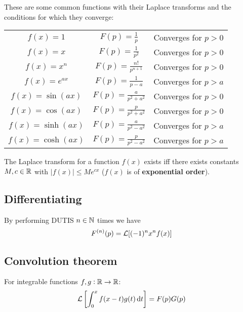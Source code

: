 \documentclass[../Year1.tex]{subfiles}
\begin{document}
\begin{theorem}
    These are some common functions with their Laplace transforms and the conditions for which they converge:
    \renewcommand{\arraystretch}{2}
    \begin{center}
        
        \begin{tabular}{|c|c|c|}
            \hline
            $f(x) = 1$ & $\displaystyle F(p) = \frac{1}{p}$ & Converges for $p>0$ \\
            $f(x) = x$ & $\displaystyle F(p) = \frac{1}{p^2}$ & Converges for $p>0$ \\
            $f(x) = x^n$ & $\displaystyle F(p) = \frac{n!}{p^{n+1}}$ & Converges for $p>0$ \\
            $f(x) = e^{ax}$ & $\displaystyle F(p) = \frac{1}{p-a}$ & Converges for $p>a$ \\
            $f(x) = \sin(ax)$ & $\displaystyle F(p) = \frac{a}{p^2+a^2}$ & Converges for $p>0$ \\
            $f(x) = \cos(ax)$ & $\displaystyle F(p) = \frac{p}{p^2+a^2}$ & Converges for $p>0$ \\
            $f(x) = \sinh(ax)$ & $\displaystyle F(p) = \frac{a}{p^2-a^2}$ & Converges for $p>a$ \\
            \rule[-12pt]{0pt}{0pt} $f(x) = \cosh(ax)$ & $\displaystyle F(p) = \frac{p}{p^2-a^2}$ & Converges for $p>a$ \\ \hline
        \end{tabular}
    \end{center}
    
\end{theorem}

\begin{theorem}
    The Laplace transform for a function $f(x)$ exists iff there exists constants $M,c\in\mathbb{R}$ with $|f(x)|\leq Me^{cx}$ ($f(x)$ is of \textbf{exponential order}).
\end{theorem}

\begingroup\belowdisplayskip=-20pt
\subsection{Differentiating}

\begin{theorem}
    By performing DUTIS $n\in\mathbb{N}$ times we have \[
        F^{(n)}(p) = \mathcal{L}[(-1)^nx^nf(x)]
    \]
\end{theorem}

\subsection{Convolution theorem}

\begin{theorem}
    For integrable functions $f,g:\mathbb{R}\rightarrow\mathbb{R}$:
    \[
        \LLL\left[\intd{0}{x}{f(x-t)g(t)}{t}\right]=F(p)G(p)
    \]
\end{theorem}
\endgroup
\end{document}
